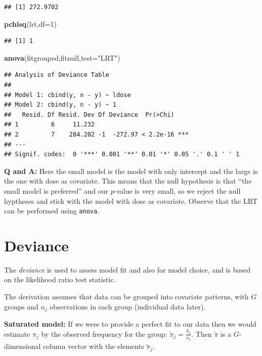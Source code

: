 \documentclass[
]{article}
\newenvironment{Shaded}{\begin{snugshade}}{\end{snugshade}}
\newcommand{\AttributeTok}[1]{\textcolor[rgb]{0.13,0.29,0.53}{#1}}
\newcommand{\DecValTok}[1]{\textcolor[rgb]{0.00,0.00,0.81}{#1}}
\newcommand{\FunctionTok}[1]{\textcolor[rgb]{0.13,0.29,0.53}{\textbf{#1}}}
\newcommand{\NormalTok}[1]{#1}
\newcommand{\StringTok}[1]{\textcolor[rgb]{0.31,0.60,0.02}{#1}}
\begin{document}
\begin{verbatim}
## [1] 272.9702
\end{verbatim}

\begin{Shaded}
\begin{Highlighting}[]
\FunctionTok{pchisq}\NormalTok{(lrt,}\AttributeTok{df=}\DecValTok{1}\NormalTok{)}
\end{Highlighting}
\end{Shaded}

\begin{verbatim}
## [1] 1
\end{verbatim}

\begin{Shaded}
\begin{Highlighting}[]
\FunctionTok{anova}\NormalTok{(fitgrouped,fitnull,}\AttributeTok{test=}\StringTok{"LRT"}\NormalTok{)}
\end{Highlighting}
\end{Shaded}

\begin{verbatim}
## Analysis of Deviance Table
## 
## Model 1: cbind(y, n - y) ~ ldose
## Model 2: cbind(y, n - y) ~ 1
##   Resid. Df Resid. Dev Df Deviance  Pr(>Chi)    
## 1         6     11.232                          
## 2         7    284.202 -1  -272.97 < 2.2e-16 ***
## ---
## Signif. codes:  0 '***' 0.001 '**' 0.01 '*' 0.05 '.' 0.1 ' ' 1
\end{verbatim}

\textbf{Q and A:} Here the small model is the model with only intercept
and the large is the one with dose as covariate. This means that the
null hypothesis is that ``the small model is preferred'' and our
\(p\)-value is very small, so we reject the null hyptheses and stick
with the model with dose as covariate. Observe that the LRT can be
performed using \texttt{anova}.

\hypertarget{deviance}{%
\section{Deviance}\label{deviance}}

The \emph{deviance} is used to assess model fit and also for model
choice, and is based on the likelihood ratio test statistic.

The derivation assumes that data can be grouped into covariate patterns,
with \(G\) groups and \(n_j\) observations in each group (individual
data later).

\textbf{Saturated model:} If we were to provide a perfect fit to our
data then we would estimate \(\pi_j\) by the observed frequency for the
group: \(\tilde{\pi}_j=\frac{y_j}{n_j}\). Then \(\tilde{\pi}\) is a
\(G\)-dimensional column vector with the elements \(\tilde{\pi}_j\).
\end{document}
